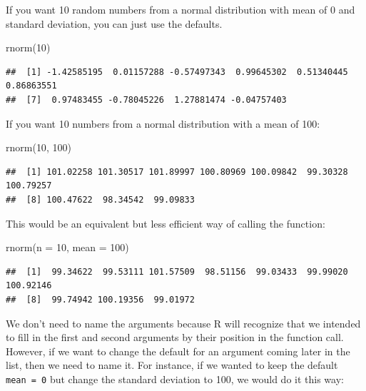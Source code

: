 \documentclass[
  oneside]{book}
\newenvironment{Shaded}{\begin{snugshade}}{\end{snugshade}}
\newcommand{\AttributeTok}[1]{\textcolor[rgb]{0.77,0.63,0.00}{#1}}
\newcommand{\DecValTok}[1]{\textcolor[rgb]{0.00,0.00,0.81}{#1}}
\newcommand{\FunctionTok}[1]{\textcolor[rgb]{0.00,0.00,0.00}{#1}}
\newcommand{\NormalTok}[1]{#1}
\begin{document}
If you want 10 random numbers from a normal distribution with mean of 0 and standard deviation, you can just use the defaults.

\begin{Shaded}
\begin{Highlighting}[]
\FunctionTok{rnorm}\NormalTok{(}\DecValTok{10}\NormalTok{)}
\end{Highlighting}
\end{Shaded}

\begin{verbatim}
##  [1] -1.42585195  0.01157288 -0.57497343  0.99645302  0.51340445  0.86863551
##  [7]  0.97483455 -0.78045226  1.27881474 -0.04757403
\end{verbatim}

If you want 10 numbers from a normal distribution with a mean of 100:

\begin{Shaded}
\begin{Highlighting}[]
\FunctionTok{rnorm}\NormalTok{(}\DecValTok{10}\NormalTok{, }\DecValTok{100}\NormalTok{)}
\end{Highlighting}
\end{Shaded}

\begin{verbatim}
##  [1] 101.02258 101.30517 101.89997 100.80969 100.09842  99.30328 100.79257
##  [8] 100.47622  98.34542  99.09833
\end{verbatim}

This would be an equivalent but less efficient way of calling the function:

\begin{Shaded}
\begin{Highlighting}[]
\FunctionTok{rnorm}\NormalTok{(}\AttributeTok{n =} \DecValTok{10}\NormalTok{, }\AttributeTok{mean =} \DecValTok{100}\NormalTok{)}
\end{Highlighting}
\end{Shaded}

\begin{verbatim}
##  [1]  99.34622  99.53111 101.57509  98.51156  99.03433  99.99020 100.92146
##  [8]  99.74942 100.19356  99.01972
\end{verbatim}

We don't need to name the arguments because R will recognize that we intended to fill in the first and second arguments by their position in the function call. However, if we want to change the default for an argument coming later in the list, then we need to name it. For instance, if we wanted to keep the default \texttt{mean\ =\ 0} but change the standard deviation to 100, we would do it this way:
\end{document}

